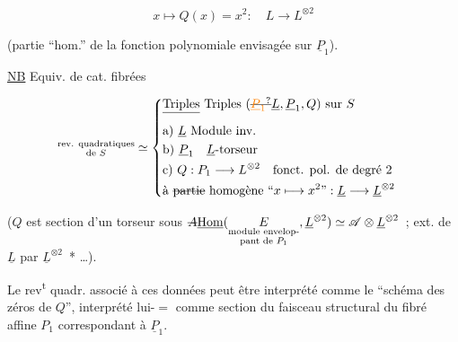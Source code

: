 \[
x\longmapsto Q(x)=x^2:\quad L\longrightarrow L^{\otimes 2}
\]

(partie ``hom.'' de la fonction polynomiale  envisagée sur $\underline P_1$).

\uline{NB} Equiv. de cat. fibrées

\[
\begin{aligned}
\substack{\text{rev. quadratiques}\\\text{de } S}
&\simeq\left\{\begin{aligned}
&\deleted{\text{Triples}}\ \text{Triples }(\deleted{\unsure{\underline P_1}}\underline L,\underline P_1,Q)\text{ sur }S\\
&\text{a) }\underline L\ \text{Module inv.}\\
&\text{b) }\underline P_1\quad \underline L\text{-torseur}\\
&\text{c) }Q:P_1\longrightarrow L^{\otimes 2}\quad\text{fonct. pol. de degré }2\\
&\text{à }\deleted{\text{partie}}\text{ homogène ``}x\longmapsto x^2\text{''}:\underline L\longrightarrow\underline L^{\otimes 2}
\end{aligned}\right.
\end{aligned}
\]

($Q$ est section d'un torseur sous $\deleted{A}\underline{\operatorname{Hom}}(\underset{\substack{\text{module envelop-}\\\text{pant de }P_1}}{E},\underline L^{\otimes 2})\simeq\mathscr A\otimes\underline L^{\otimes 2}$~; ext. de $\underline L$ par $\underline L^{\otimes 2}$~* \ldots).


Le rev\textsuperscript{t} quadr. associé à ces données peut être interprété comme le ``schéma des zéros de $Q$'', interprété lui-$=$ comme section du faisceau structural du fibré affine $P_1$ correspondant à $\underline P_1$.


